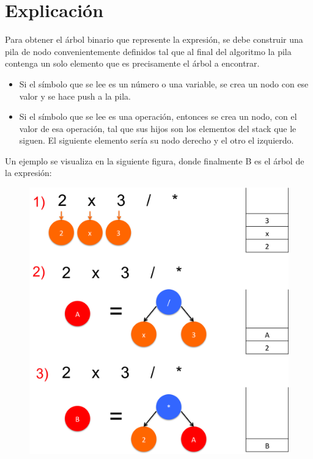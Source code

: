 \documentclass[dcc]{fcfmcourse}
\begin{document}
\newpage
\section{Explicación}

Para obtener el árbol binario que represente la expresión, se debe construir una pila de nodo convenientemente definidos tal que al final del algoritmo la pila contenga un solo elemento que es precisamente el árbol a encontrar.
\begin{itemize}
    \item Si el símbolo que se lee es un número o una variable, se crea un nodo con ese valor y se hace push a la pila.
    
    \item Si el símbolo que se lee es una operación, entonces se crea un nodo, con el valor de esa operación, tal que sus hijos son los elementos del stack que le siguen. El siguiente elemento sería su nodo derecho y el otro el izquierdo.
    
\end{itemize}
    
Un ejemplo se visualiza en la siguiente figura, donde finalmente B es el árbol de la expresión:

\begin{figure}[!h]
    \centering
    \includegraphics[scale=0.6]{imagenes/stack.png}
\end{figure}
\end{document}
